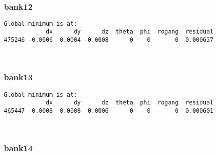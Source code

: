 \documentclass[11pt]{article}
\begin{document}
    \begin{center}
    \end{center}
    { \hspace*{\fill} \\}
    
    \hypertarget{bank12}{%
\subsubsection{bank12}\label{bank12}}

    \begin{Verbatim}[commandchars=\\\{\}]
Global minimum is at:
            dx      dy      dz  theta  phi  rogang  residual
475246 -0.0006  0.0004 -0.0008      0    0       0  0.000637
    \end{Verbatim}

    \begin{center}
    \end{center}
    { \hspace*{\fill} \\}
    
    \hypertarget{bank13}{%
\subsubsection{bank13}\label{bank13}}

    \begin{Verbatim}[commandchars=\\\{\}]
Global minimum is at:
            dx      dy      dz  theta  phi  rogang  residual
465447 -0.0008  0.0008 -0.0006      0    0       0  0.000601
    \end{Verbatim}

    \begin{center}
    \end{center}
    { \hspace*{\fill} \\}
    
    \hypertarget{bank14}{%
\subsubsection{bank14}\label{bank14}}
\end{document}
